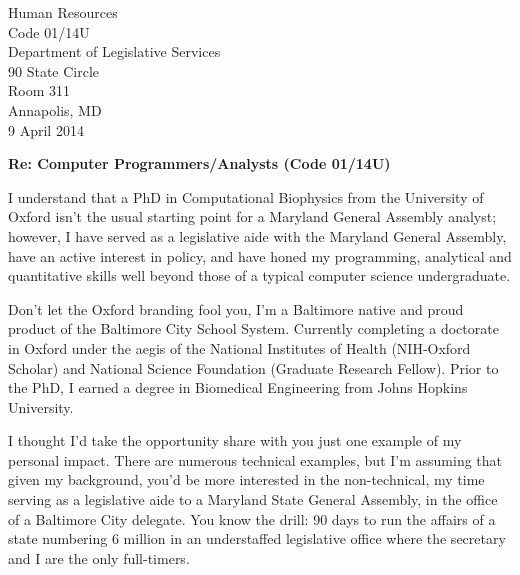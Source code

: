 \documentclass[a4paper]{../res}
\begin{document}
 
\begin{sloppypar}
 
%


\begin{resume} 
Human Resources \\
Code 01/14U \\
Department of Legislative Services \\
90 State Circle \\
Room 311 \\
Annapolis, MD \\
 
9 April 2014



\textbf{Re: Computer Programmers/Analysts (Code 01/14U)}

I understand that a PhD in Computational Biophysics from the University of Oxford isn't the usual starting point for a Maryland General Assembly analyst; however, I have served as a legislative aide with the Maryland General Assembly, have an active interest in policy, and have honed my programming, analytical and quantitative skills well beyond those of a typical computer science undergraduate. 

Don't let the Oxford branding fool you, I'm a Baltimore native and proud product of the Baltimore City School System. Currently completing a doctorate in Oxford under the aegis of the National Institutes of Health (NIH-Oxford Scholar) and National Science Foundation (Graduate Research Fellow). Prior to the PhD, I earned a degree in Biomedical Engineering from Johns Hopkins University.

I thought I'd take the opportunity share with you just one example of my personal impact. There are numerous technical examples, but I'm assuming that given my background, you'd be more interested in the non-technical, my time serving as a legislative aide to a Maryland State General Assembly, in the office of a Baltimore City delegate. You know the drill: 90 days to run the affairs of a state numbering 6 million in an understaffed legislative office where the secretary and I are the only full-timers.


\end{resume}
\end{sloppypar}
\end{document}
